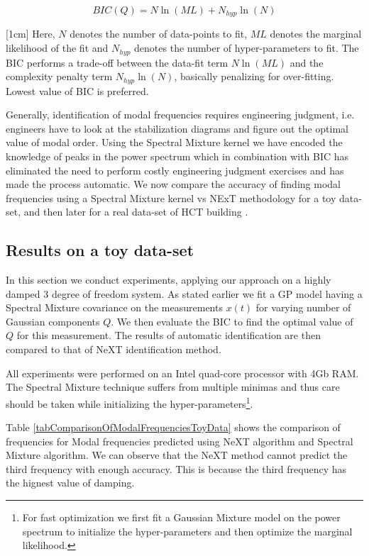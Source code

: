 \begin{mdframed}[hidealllines=true,backgroundcolor=blue!20]
\begin{equation}\label{eq:BIC}
    BIC(Q) = N\ln(ML) + N_{hyp}\ln(N)
\end{equation}

[1cm]
Here, $N$ denotes the number of data-points to fit, $ML$ denotes the marginal likelihood of the fit and $N_{hyp}$ denotes the number of hyper-parameters to fit. The BIC performs a trade-off between the data-fit term $N\ln(ML)$ and the complexity penalty term $N_{hyp}\ln(N)$, basically penalizing for over-fitting. Lowest value of BIC is preferred. 
\end{mdframed}

Generally, identification of modal frequencies requires engineering judgment, i.e. engineers have to look at the stabilization diagrams and figure out the optimal value of modal order. Using the Spectral Mixture kernel we have encoded the knowledge of peaks in the power spectrum which in combination with BIC has eliminated the need to perform costly engineering judgment exercises and has made the process automatic. We now compare the accuracy of finding modal frequencies using a Spectral Mixture kernel vs NExT \cite{james1995natural} methodology for a toy data-set, and then later for a real data-set of HCT building \cite{brincker2000modal}.

\subsection{Results on a toy data-set}
In this section we conduct experiments, applying our approach on a highly damped 3 degree of freedom system. As stated earlier we fit a GP model having a Spectral Mixture covariance on the measurements $x(t)$ for varying number of Gaussian components $Q$. We then evaluate the BIC to find the optimal value of $Q$ for this measurement. The results of automatic identification are then compared to that of NeXT identification method. 

All experiments were performed on an Intel quad-core processor with 4Gb RAM. The Spectral Mixture technique suffers from multiple minimas and thus care should be taken while initializing the hyper-parameters\footnote{For fast optimization we first fit a Gaussian Mixture model on the power spectrum to initialize the hyper-parameters and then optimize the marginal likelihood.}.  

Table \ref{tabComparisonOfModalFrequenciesToyData} shows the comparison of frequencies for Modal frequencies predicted using NeXT algorithm and Spectral Mixture algorithm. We can observe that the NeXT method cannot predict the third frequency with enough accuracy. This is because the third frequency has the hignest value of damping.

